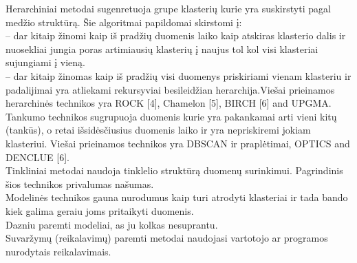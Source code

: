 \documentclass{VUMIFInfKursinis}
\begin{document}
	Herarchiniai metodai sugenretuoja  grupe klasterių kurie yra suskirstyti pagal medžio struktūrą. Šie algoritmai papildomai skirstomi į:\\
		 – dar kitaip žinomi kaip  iš pradžių duomenis laiko kaip atskiras klasterio dalis ir nuosekliai jungia poras artimiausių klasterių į naujus tol kol visi klasteriai sujungiami į vieną.\\
		 – dar kitaip žinomas kaip  iš pradžių visi duomenys priskiriami vienam klasteriu ir padalijimai yra atliekami rekursyviai besileidžian herarchija.Viešai prieinamos herarchinės technikos yra ROCK [4], Chamelon [5], BIRCH [6] and UPGMA. \\
		Tankumo technikos sugrupuoja duomenis kurie yra pakankamai arti vieni kitų (tankūs), o retai išsidėsčiusius duomenis laiko  ir yra nepriskiremi jokiam klasteriui. Viešai prieinamos technikos yra DBSCAN ir praplėtimai, OPTICS and DENCLUE [6].\\
		Tinkliniai metodai naudoja  tinklelio struktūrą duomenų surinkimui. Pagrindinis šios technikos privalumas \textendash{} našumas.\\
		Modelinės technikos gauna nurodumus kaip turi atrodyti klasteriai ir tada bando kiek galima geraiu joms pritaikyti duomenis.\\
		Dazniu paremti modeliai, as ju kolkas nesuprantu.\\
	Suvaržymų (reikalavimų) paremti metodai naudojasi vartotojo ar programos nurodytais reikalavimais.
\end{document}
